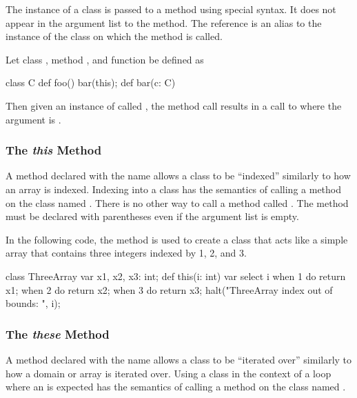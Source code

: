 The instance of a class is passed to a method using special syntax.
It does not appear in the argument list to the method.  The
reference  is an alias to the instance of the class on
which the method is called.

\begin{example}
Let class , method , and function  be
defined as
\begin{chapel}
class C {
  def foo() {
    bar(this);
  }
}
def bar(c: C) { }
\end{chapel}
Then given an instance of  called , the method
call  results in a call to  where the argument
is .
\end{example}

\subsubsection{The {\em this} Method}
\label{The_em_this_Method}

A method declared with the name  allows a class to be
``indexed'' similarly to how an array is indexed.  Indexing into a
class has the semantics of calling a method on the class
named .  There is no other way to call a method
called .  The  method must be declared with
parentheses even if the argument list is empty.

\begin{example}
In the following code, the  method is used to create a
class that acts like a simple array that contains three integers
indexed by 1, 2, and 3.
\begin{chapel}
class ThreeArray {
  var x1, x2, x3: int;
  def this(i: int) var {
    select i {
      when 1 do return x1;
      when 2 do return x2;
      when 3 do return x3;
    }
    halt("ThreeArray index out of bounds: ", i);
  }
}
\end{chapel}
\end{example}

\subsubsection{The {\em these} Method}
\label{The_these_Method}

A method declared with the name  allows a class to be
``iterated over'' similarly to how a domain or array is iterated over.
Using a class in the context of a loop where
an  is expected has the semantics of calling
a method on the class named .

